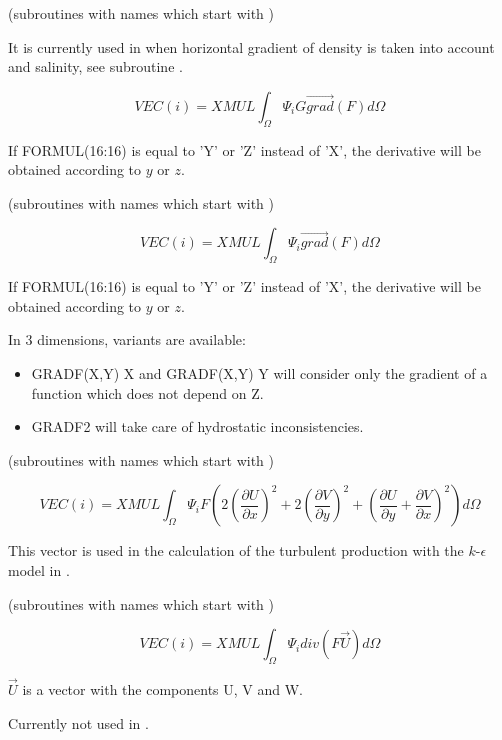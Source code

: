 
(subroutines with names which start with )

It is currently used in  when horizontal gradient of density is taken
into account and salinity, see subroutine .

\[VEC(i)=XMUL \int _{\Omega }\Psi _{i}  G  \overrightarrow{grad} ( F )  d\Omega  \]

If FORMUL(16:16) is equal to 'Y' or 'Z' instead of 'X', the derivative will be
obtained according to $y$ or $z$.


(subroutines with names which start with )

\[VEC(i)=XMUL \int _{\Omega }\Psi _{i}    \overrightarrow{grad} ( F )  d\Omega  \]

If FORMUL(16:16) is equal to 'Y' or 'Z' instead of 'X', the derivative will be
obtained according to $y$ or $z$.

In 3 dimensions, variants are available:
\begin{itemize}
  \item GRADF(X,Y)     X and GRADF(X,Y)     Y will consider only the gradient
    of a function which does not depend on Z.
  \item GRADF2 will take care of hydrostatic inconsistencies.
\end{itemize}


(subroutines with names which start with )

\[VEC(i)=XMUL \int _{\Omega }\Psi _{i}  F   \left(2 \left(\frac{\partial U}{\partial x} \right)^{2} +2 \left(\frac{\partial V}{\partial y} \right)^{2} + \left(\frac{\partial U}{\partial y} +\frac{\partial V}{\partial x} \right)^{2} \right)    d\Omega  \]

This vector is used in the calculation of the turbulent production with the
$k$-$\epsilon$ model in .


(subroutines with names which start with )

\[VEC(i)=XMUL \int _{\Omega }\Psi _{i}  div(F \vec{U})  d\Omega  \]

$\vec{U}$ is a vector with the components U, V and W.

Currently not used in \tel.

